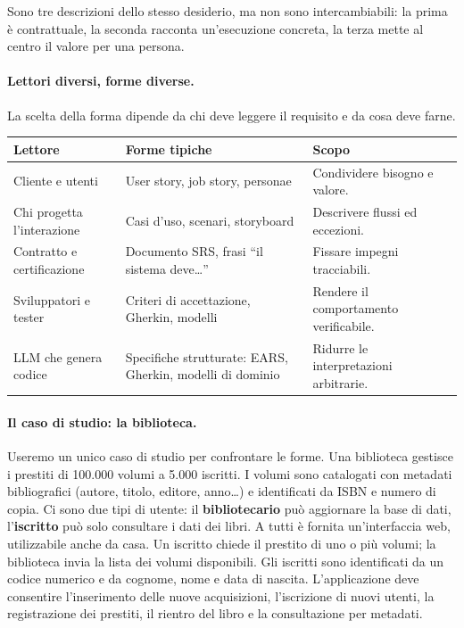 \documentclass[12pt]{extarticle}
\begin{document}
\noindent Sono tre descrizioni dello stesso desiderio, ma non sono intercambiabili: la prima è contrattuale, la seconda racconta un'esecuzione concreta, la terza mette al centro il valore per una persona.

\paragraph{Lettori diversi, forme diverse.}
La scelta della forma dipende da chi deve leggere il requisito e da cosa deve farne.

\begin{center}
\small
\begin{tabular}{p{4.2cm}p{5.6cm}p{5.4cm}}
    \toprule
    \textbf{Lettore} & \textbf{Forme tipiche} & \textbf{Scopo} \\
    \midrule
    Cliente e utenti & User story, job story, personae & Condividere bisogno e valore. \\
    \addlinespace
    Chi progetta l'interazione & Casi d'uso, scenari, storyboard & Descrivere flussi ed eccezioni. \\
    \addlinespace
    Contratto e certificazione & Documento SRS, frasi ``il sistema deve\ldots'' & Fissare impegni tracciabili. \\
    \addlinespace
    Sviluppatori e tester & Criteri di accettazione, Gherkin, modelli & Rendere il comportamento verificabile. \\
    \addlinespace
    LLM che genera codice & Specifiche strutturate: EARS, Gherkin, modelli di dominio & Ridurre le interpretazioni arbitrarie. \\
    \bottomrule
\end{tabular}
\end{center}

\paragraph{Il caso di studio: la biblioteca.}
Useremo un unico caso di studio per confrontare le forme. Una biblioteca gestisce i prestiti di 100.000 volumi a 5.000 iscritti. I volumi sono catalogati con metadati bibliografici (autore, titolo, editore, anno\ldots) e identificati da ISBN e numero di copia. Ci sono due tipi di utente: il \textbf{bibliotecario} può aggiornare la base di dati, l'\textbf{iscritto} può solo consultare i dati dei libri. A tutti è fornita un'interfaccia web, utilizzabile anche da casa. Un iscritto chiede il prestito di uno o più volumi; la biblioteca invia la lista dei volumi disponibili. Gli iscritti sono identificati da un codice numerico e da cognome, nome e data di nascita. L'applicazione deve consentire l'inserimento delle nuove acquisizioni, l'iscrizione di nuovi utenti, la registrazione dei prestiti, il rientro del libro e la consultazione per metadati.
\end{document}
